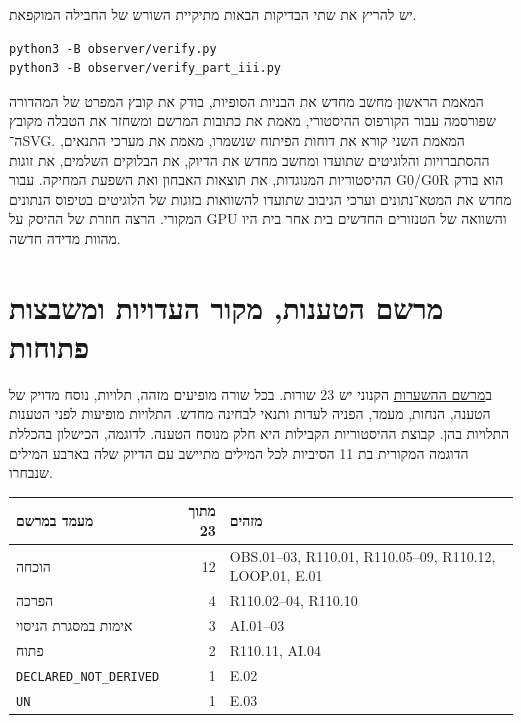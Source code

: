 \documentclass[11pt,a4paper]{article}
\DeclareRobustCommand{\textenglish}[1]{\foreignlanguage{english}{#1}}
\newenvironment{english}{\begin{otherlanguage}{english}}{\end{otherlanguage}}
\newcommand{\src}[2]{\href{https://github.com/Dnarts/rule110-dependency-fronts/blob/v2.2.1-monograph-multilingual/#1}{#2}}
\theoremstyle{definition}
\begin{document}
\noindent\begin{minipage}{\linewidth}
יש להריץ את שתי הבדיקות הבאות מתיקיית השורש של החבילה המוקפאת.
\begin{english}
\begin{verbatim}
python3 -B observer/verify.py
python3 -B observer/verify_part_iii.py
\end{verbatim}
\end{english}
\end{minipage}\par
המאמת הראשון מחשב מחדש את הבניות הסופיות, בודק את קובץ המפרט של המהדורה שפורסמה עבור הקורפוס ההיסטורי, מאמת את כתובות המרשם ומשחזר את הטבלה מקובץ ה־\textenglish{SVG}. המאמת השני קורא את דוחות הפיתוח שנשמרו, מאמת את מערכי התנאים, ההסתברויות והלוגיטים שתועדו ומחשב מחדש את הדיוק, את הבלוקים השלמים, את זוגות ההיסטוריות המנוגדות, את תוצאות האבחון ואת השפעת המחיקה. עבור \textenglish{G0/G0R} הוא בודק מחדש את המטא־נתונים וערכי הגיבוב שתועדו להשוואות בזוגות של הלוגיטים בטיפוס הנתונים המקורי. הרצה חוזרת של ההיסק על \textenglish{GPU} והשוואה של הטנזורים החדשים בית אחר בית היו מהוות מדידה חדשה.

\section{מרשם הטענות, מקור העדויות ומשבצות פתוחות}
\label{app:registers}

ב\src{observer/hypotheses.tsv}{מרשם ההשערות} הקנוני יש 23 שורות. בכל שורה מופיעים מזהה, תלויות, נוסח מדויק של הטענה, הנחות, מעמד, הפניה לעדות ותנאי לבחינה מחדש. התלויות מופיעות לפני הטענות התלויות בהן. קבוצת ההיסטוריות הקבילות היא חלק מנוסח הטענה. לדוגמה, הכישלון בהכללת הדוגמה המקורית בת 11 הסיביות לכל המילים מתיישב עם הדיוק שלה בארבע המילים שנבחרו.

\begin{center}
\begin{tabularx}{\linewidth}{@{}l r X@{}}
\toprule
מעמד במרשם & מתוך 23 & מזהים \\
\midrule
הוכחה & 12 & \textenglish{OBS.01--03, R110.01, R110.05--09, R110.12, LOOP.01, E.01} \\
הפרכה & 4 & \textenglish{R110.02--04, R110.10} \\
אימות במסגרת הניסוי & 3 & \textenglish{AI.01--03} \\
פתוח & 2 & \textenglish{R110.11, AI.04} \\
\textenglish{\texttt{DECLARED\_NOT\_DERIVED}} & 1 & \textenglish{E.02} \\
\textenglish{\texttt{UN}} & 1 & \textenglish{E.03} \\
\bottomrule
\end{tabularx}
\end{center}
\end{document}
